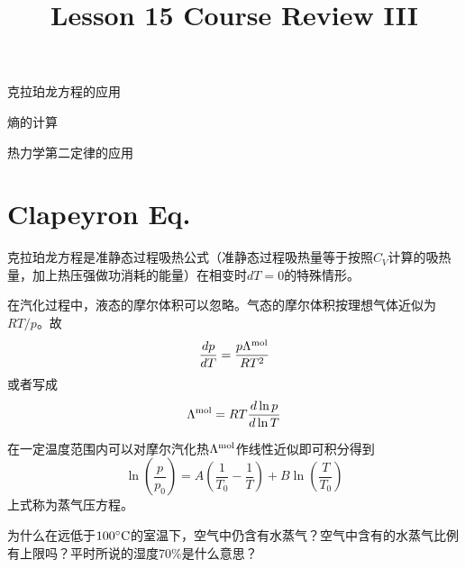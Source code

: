 \documentclass[CJK]{beamer}
\title{Lesson 15 Course Review III}
\author{}
\date{}
\begin{document}


\begin{frame}
  \bch
  \bitem
\item{克拉珀龙方程的应用}
\item{熵的计算}
\item{热力学第二定律的应用}
  \eitem
  \ech
\end{frame}

\section{Clapeyron Eq.}

\begin{frame}
  \bch
  \ech
\end{frame}

\begin{frame}
  \bch
  \emini
  克拉珀龙方程是准静态过程吸热公式（准静态过程吸热量等于按照$C_V$计算的吸热量，加上热压强做功消耗的能量）在相变时$dT=0$的特殊情形。
  \emini
  
  \ech
\end{frame}

\begin{frame}
  \bch
  在汽化过程中，液态的摩尔体积可以忽略。气态的摩尔体积按理想气体近似为$RT/p$。故
  $$ \frac{dp}{dT} = \frac{p\Lambda^{\rm mol}}{RT^2}$$
  或者写成
{\blue  $$ \Lambda^{\rm mol} = RT \frac{d \ln p}{d \ln T} $$}
  \ech
\end{frame}


\begin{frame}
  \bch
  在一定温度范围内可以对摩尔汽化热$\Lambda^{\rm mol}$作线性近似即可积分得到
  $$\ln\left(\frac{p}{p_0}\right) = A\left(\frac{1}{T_0} - \frac{1}{T}\right) + B \ln\left(\frac{T}{T_0}\right)$$
  上式称为蒸气压方程。
  \ech
\end{frame}


\begin{frame}
  \bch
  为什么在远低于$100^\circ \mathrm{C}$的室温下，空气中仍含有水蒸气？空气中含有的水蒸气比例有上限吗？平时所说的湿度70\%是什么意思？
  \ech
\end{frame}
\end{document}
